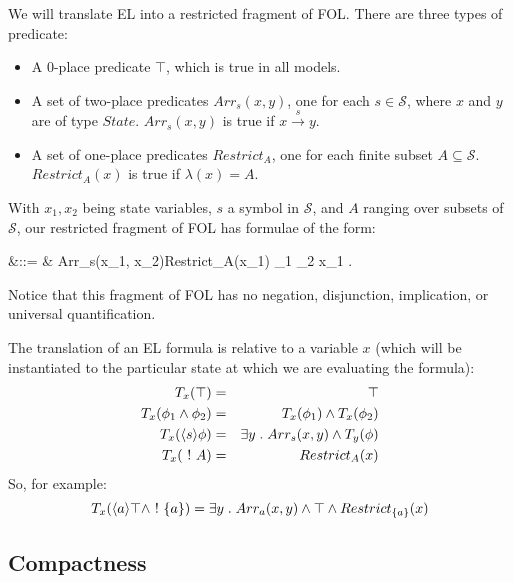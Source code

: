 We will translate EL into a restricted fragment of FOL.
There are three types of predicate:
\begin{itemize}
\item
A 0-place predicate $\top$, which is true in all models.
\item
A set of two-place predicates $Arr_s(x, y)$, one for each $s \in \mathcal{S}$, where $x$ and $y$ are of type $State$. $Arr_s(x, y)$ is true if $x \xrightarrow{s} y$.
\item
A set of one-place predicates $Restrict_A$, one for each finite subset $A \subseteq \mathcal{S}$. 
$Restrict_{A}(x)$ is true if $\lambda(x) = A$.
\end{itemize}
With $x_1, x_2$ being state variables, $s$ a symbol in $\mathcal{S}$, and $A$ ranging over subsets of $\mathcal{S}$, our restricted fragment of FOL has formulae of the form:
\begin{GRAMMAR}
  \phi 
     &\quad ::= \quad&
  \top \fOr Arr_{s}(x_1, x_2)\fOr Restrict_A(x_1) \fOr \phi_1 \AND \phi_2 \fOr \exists x_1 . \phi 
\end{GRAMMAR}
Notice that this fragment of FOL has no negation, disjunction, implication, or universal quantification.

The translation of an EL formula is relative to a variable $x$ (which will be instantiated to the particular state at which we are evaluating the formula):
\begin{eqnarray}
T_x(\top) & = & \top \nonumber \\
T_x(\phi_1 \land \phi_2) & = & T_x(\phi_1) \land T_x(\phi_2) \nonumber \\
T_x(\langle s \rangle \phi) & = & \exists y \; . \; Arr_s(x,y) \land T_y(\phi) \nonumber \\
T_x(\ ! \  A) & = & Restrict_A(x) \nonumber
\end{eqnarray}
So, for example:
\[
T_x(\langle a \rangle \top \land \ ! \  \{a\}) = \exists y \; . \; Arr_a(x,y) \land \top \land Restrict_{\{a\}}(x)
\]


\subsection{Compactness}

